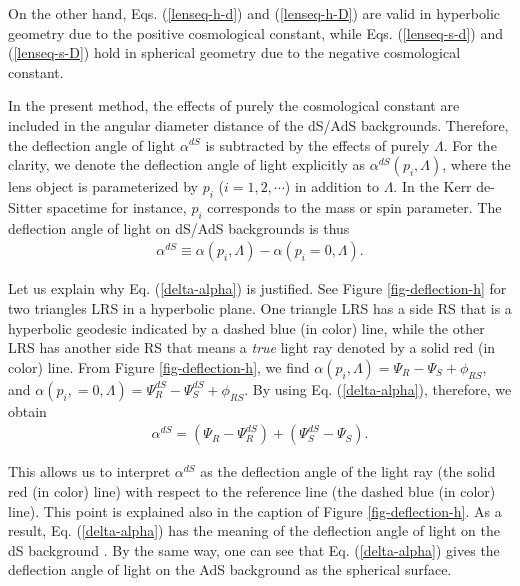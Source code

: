\documentclass[twocolumn,showpacs,preprintnumbers,amsmath,amssymb]{revtex4-1}
\begin{document}
On the other hand, 
Eqs. (\ref{lenseq-h-d}) and (\ref{lenseq-h-D}) are 
valid in hyperbolic geometry due to the positive cosmological constant, 
while 
Eqs. (\ref{lenseq-s-d}) and (\ref{lenseq-s-D}) hold 
in spherical geometry due to the negative cosmological constant. 

In the present method, 
the effects of purely the cosmological constant are included 
in the angular diameter distance of the dS/AdS backgrounds.  
Therefore, the deflection angle of light $\alpha^{dS}$ is subtracted by 
the effects of purely $\Lambda$. 
For the clarity, we denote the deflection angle of light explicitly as 
$\alpha^{dS}(p_i, \Lambda)$, 
where the lens object is parameterized by 
$p_i$  ($i = 1, 2, \cdots $) in addition to $\Lambda$. 
In the Kerr de-Sitter spacetime for instance, 
$p_i$ corresponds to the mass or spin parameter.  
The deflection angle of light on dS/AdS backgrounds is thus  
\begin{align}
\alpha^{dS}  
\equiv \alpha(p_i, \Lambda) - \alpha(p_i=0, \Lambda) .
\label{delta-alpha}
\end{align}

Let us explain why Eq. (\ref{delta-alpha}) is justified. 
See Figure \ref{fig-deflection-h} for two triangles LRS in a hyperbolic plane. 
One triangle LRS has a side RS that is a hyperbolic geodesic indicated by 
a dashed blue (in color) line, 
while the other LRS has another side RS that means a {\it true} light ray 
denoted by a solid red (in color) line. 
From Figure \ref{fig-deflection-h}, we find 
$\alpha(p_i, \Lambda) = \Psi_R - \Psi_S + \phi_{RS}$, 
and 
$\alpha(p_i, = 0, \Lambda) = \Psi_R^{dS} - \Psi_S^{dS} + \phi_{RS}$. 
By using Eq. (\ref{delta-alpha}), therefore, we obtain 
\begin{align}
\alpha^{dS}  
= 
(\Psi_R - \Psi_R^{dS}) + (\Psi_S^{dS} - \Psi_S) .
\label{delta-alpha-2}
\end{align}

This allows us to interpret $\alpha^{dS}$
as the deflection angle of the light ray (the solid red (in color) line) 
with respect to the reference line (the dashed blue (in color) line). 
This point is explained also in the caption of Figure \ref{fig-deflection-h}. 
As a result, Eq. (\ref{delta-alpha}) has the meaning of the deflection angle 
of light on the dS background 
\cite{footnote-4}. 
By the same way, one can see that Eq. (\ref{delta-alpha}) 
gives the deflection angle of light on the AdS background 
as the spherical surface. 
\end{document}
